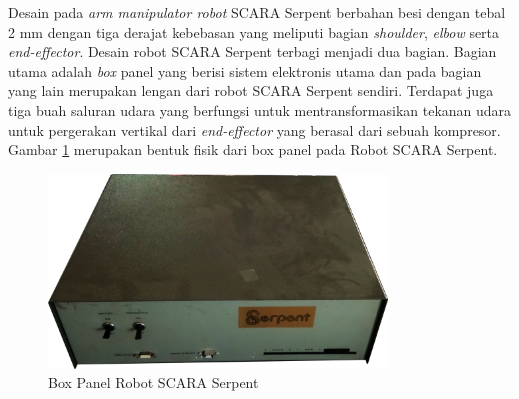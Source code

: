 Desain pada\textit{ arm manipulator robot} SCARA Serpent berbahan besi dengan tebal 2 mm dengan tiga derajat kebebasan yang meliputi bagian \textit{shoulder}, \textit{elbow} serta \textit{end-effector}. Desain robot SCARA Serpent terbagi menjadi dua bagian. Bagian utama adalah \textit{box} panel yang berisi sistem elektronis utama dan pada bagian yang lain merupakan lengan dari robot SCARA Serpent sendiri. Terdapat juga tiga buah saluran udara yang berfungsi untuk mentransformasikan tekanan udara untuk pergerakan vertikal dari \textit{end-effector} yang berasal dari sebuah kompresor. Gambar \ref{pic.boxpanel} merupakan bentuk fisik dari box panel pada Robot SCARA Serpent.
\begin{figure}[H]
	\centering
	\includegraphics[width=9cm]{gambar/boxpanel.png}
	\caption{Box Panel Robot SCARA Serpent}
	\label{pic.boxpanel}
\end{figure}

